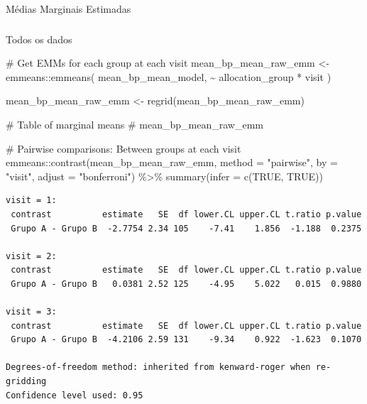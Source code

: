 \documentclass[
  12pt,
]{article}
\makeatletter
\let\oldparagraph\paragraph
\renewcommand{\paragraph}{
    \@ifstar
      \xxxParagraphStar
      \xxxParagraphNoStar
  }
\newcommand{\xxxParagraphStar}[1]{\oldparagraph*{#1}\mbox{}}
\newcommand{\xxxParagraphNoStar}[1]{\oldparagraph{#1}\mbox{}}
\let\oldsubparagraph\subparagraph
\renewcommand{\subparagraph}{
    \@ifstar
      \xxxSubParagraphStar
      \xxxSubParagraphNoStar
  }
\newcommand{\xxxSubParagraphStar}[1]{\oldsubparagraph*{#1}\mbox{}}
\newcommand{\xxxSubParagraphNoStar}[1]{\oldsubparagraph{#1}\mbox{}}
\newenvironment{Shaded}{\begin{snugshade}}{\end{snugshade}}
\newcommand{\AttributeTok}[1]{\textcolor[rgb]{0.40,0.45,0.13}{#1}}
\newcommand{\CommentTok}[1]{\textcolor[rgb]{0.37,0.37,0.37}{#1}}
\newcommand{\ConstantTok}[1]{\textcolor[rgb]{0.56,0.35,0.01}{#1}}
\newcommand{\FunctionTok}[1]{\textcolor[rgb]{0.28,0.35,0.67}{#1}}
\newcommand{\NormalTok}[1]{\textcolor[rgb]{0.00,0.23,0.31}{#1}}
\newcommand{\OtherTok}[1]{\textcolor[rgb]{0.00,0.23,0.31}{#1}}
\newcommand{\SpecialCharTok}[1]{\textcolor[rgb]{0.37,0.37,0.37}{#1}}
\newcommand{\StringTok}[1]{\textcolor[rgb]{0.13,0.47,0.30}{#1}}
\makeatother
\begin{document}
\paragraph{Médias Marginais
Estimadas}\label{muxe9dias-marginais-estimadas-15}

\subparagraph{Todos os dados}\label{todos-os-dados-15}

\begin{Shaded}
\begin{Highlighting}[]
\CommentTok{\# Get EMMs for each group at each visit}
\NormalTok{mean\_bp\_mean\_raw\_emm }\OtherTok{\textless{}{-}}\NormalTok{ emmeans}\SpecialCharTok{::}\FunctionTok{emmeans}\NormalTok{(}
\NormalTok{    mean\_bp\_mean\_model, }
    \SpecialCharTok{\textasciitilde{}}\NormalTok{ allocation\_group }\SpecialCharTok{*}\NormalTok{ visit}
\NormalTok{)}

\NormalTok{mean\_bp\_mean\_raw\_emm }\OtherTok{\textless{}{-}} \FunctionTok{regrid}\NormalTok{(mean\_bp\_mean\_raw\_emm)}

\CommentTok{\# Table of marginal means}
\CommentTok{\# mean\_bp\_mean\_raw\_emm}

\CommentTok{\# Pairwise comparisons: Between groups at each visit}
\NormalTok{emmeans}\SpecialCharTok{::}\FunctionTok{contrast}\NormalTok{(mean\_bp\_mean\_raw\_emm,}
\AttributeTok{method =} \StringTok{"pairwise"}\NormalTok{, }\AttributeTok{by =} \StringTok{"visit"}\NormalTok{,}
\AttributeTok{adjust =} \StringTok{"bonferroni"}\NormalTok{) }\SpecialCharTok{\%\textgreater{}\%} \FunctionTok{summary}\NormalTok{(}\AttributeTok{infer =} \FunctionTok{c}\NormalTok{(}\ConstantTok{TRUE}\NormalTok{, }\ConstantTok{TRUE}\NormalTok{))}
\end{Highlighting}
\end{Shaded}

\begin{verbatim}
visit = 1:
 contrast          estimate   SE  df lower.CL upper.CL t.ratio p.value
 Grupo A - Grupo B  -2.7754 2.34 105    -7.41    1.856  -1.188  0.2375

visit = 2:
 contrast          estimate   SE  df lower.CL upper.CL t.ratio p.value
 Grupo A - Grupo B   0.0381 2.52 125    -4.95    5.022   0.015  0.9880

visit = 3:
 contrast          estimate   SE  df lower.CL upper.CL t.ratio p.value
 Grupo A - Grupo B  -4.2106 2.59 131    -9.34    0.922  -1.623  0.1070

Degrees-of-freedom method: inherited from kenward-roger when re-gridding 
Confidence level used: 0.95 
\end{verbatim}
\end{document}
